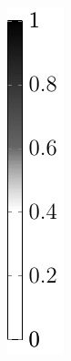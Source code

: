 \documentclass[aspectratio=169,xcolor=dvipsnames,11pt]{beamer}
\begin{document}
\begin{frame}
\begin{figure}
\begin{minipage}[c]{0.032\textwidth}
		\includegraphics[width=\textwidth]{Figures/TopOpt/colorbar/colorbar_bw.pdf}

\end{minipage}
\end{figure}
\end{frame}
\end{document}
